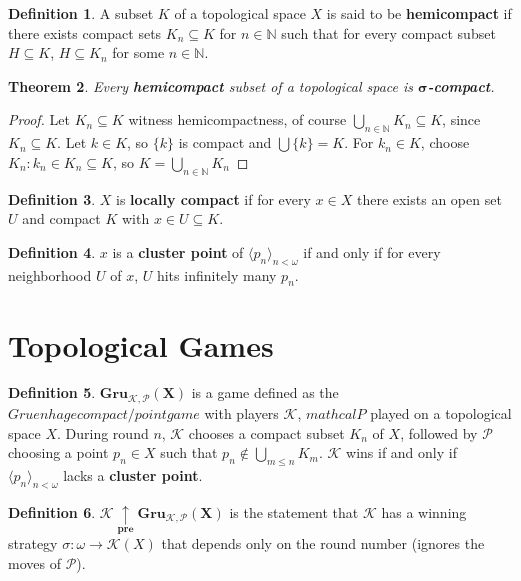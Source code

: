 \documentclass{amsart}
\theoremstyle{plain}
\newtheorem{theorem}{Theorem}
\theoremstyle{definition}
\newtheorem{definition}[theorem]{Definition}
\theoremstyle{remark}
\begin{document}
	\begin{definition}
	  A subset \(K\) of a topological space \(X\) is said to be \textbf{hemicompact} if there exists compact sets $K_n \subseteq K$ for $n \in \mathbb{N}$ such that for every compact subset \(H\subseteq K\), \(H\subseteq K_n\) for some \(n\in\mathbb N\).
	\end{definition}

	\begin{theorem}
		Every \textbf{hemicompact} subset of a topological space is \(\boldsymbol{\sigma}\)\textbf{-compact}.
	\end{theorem}
	\begin{proof}
		Let $K_n \subseteq K$ witness hemicompactness, of course $\underset{n \in \mathbb{N}}{\bigcup}K_n \subseteq K$, since $K_n \subseteq K$. Let $k \in K$, so $\lbrace k \rbrace$ is compact and $\bigcup\lbrace k \rbrace = K$. For $k_n \in K$, choose $K_n : k_n \in K_n \subseteq K$, so $K = \underset{n \in \mathbb{N}}{\bigcup}K_n$
	\end{proof}

	\begin{definition}
		$X$ is \textbf{locally compact} if for every $x \in X$ there exists an open set $U$ and compact $K$ with $x \in U \subseteq K$.
	\end{definition}
	
	\begin{definition}
		$x$ is a \textbf{cluster point} of $\langle p_n \rangle_{n < \omega}$ if and only if for every neighborhood $U$ of $x$, $U$ hits infinitely many $p_n$.
	\end{definition}

\section{Topological Games}

	\begin{definition}
		$\boldsymbol{Gru_{\mathcal{K},\mathcal{P}}(X)}$ is a game defined as the $Gruenhage compact/point game$ with players $\mathcal{K}$, $mathcal{P}$ played on a topological space $X$. During round $n$, $\mathcal{K}$ chooses a compact subset $K_n$ of $X$, followed by $\mathcal{P}$ choosing a point $p_n \in X$ such that $p_n \not\in \bigcup_{m\leq n}K_m$. $\mathcal{K}$ wins if and only if $\langle p_n \rangle_{n<\omega}$ lacks a \textbf{cluster point}. 
	\end{definition}
	
	\begin{definition}
	$\boldsymbol{\mathcal{K} \underset{pre}{\uparrow} Gru_{\mathcal{K}, \mathcal{P}}(X)}$ is the statement that $\mathcal{K}$ has a winning strategy $\sigma : \omega \rightarrow \mathcal{K}(X)$ that depends only on the round number (ignores the moves of $\mathcal{P}$).
	\end{definition}
\end{document}
